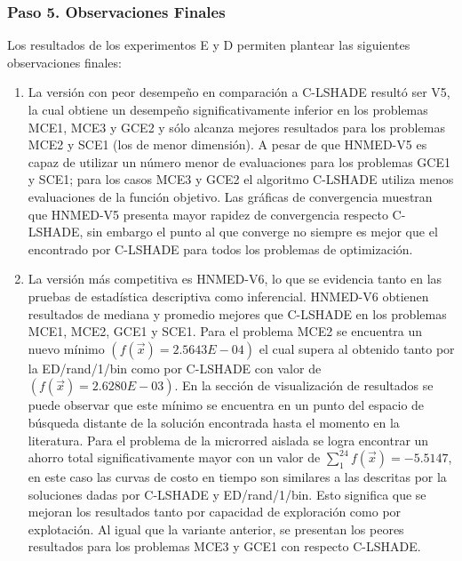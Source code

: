 \subsubsection{Paso 5. Observaciones Finales}
Los resultados de los experimentos E y D permiten plantear las siguientes observaciones finales:
\begin{enumerate}
 \item La versión con peor desempeño en comparación a C-LSHADE resultó ser V5, la cual obtiene un desempeño significativamente inferior en los problemas MCE1, MCE3 y GCE2  y sólo alcanza mejores resultados para los problemas MCE2 y SCE1 (los de menor dimensión). A pesar de que HNMED-V5 es capaz de utilizar un número menor de evaluaciones para los problemas GCE1 y SCE1; para los casos MCE3 y GCE2 el algoritmo C-LSHADE utiliza menos evaluaciones de la función objetivo. Las gráficas de convergencia muestran que HNMED-V5 presenta mayor rapidez de convergencia respecto C-LSHADE, sin embargo el punto al que converge no siempre es mejor que el encontrado por C-LSHADE para todos los problemas de optimización.  

 \item  La versión más competitiva es HNMED-V6, lo que se evidencia tanto en las pruebas de estadística descriptiva como inferencial. HNMED-V6 obtienen resultados de mediana y promedio mejores que C-LSHADE en los problemas MCE1, MCE2, GCE1 y SCE1. Para el problema MCE2 se encuentra un nuevo mínimo $(f(\vec{x})=2.5643E-04)$ el cual supera al obtenido tanto por la ED/rand/1/bin como por C-LSHADE con valor de $(f(\vec{x})=2.6280E-03)$. En la sección de visualización de resultados se puede observar que este mínimo se encuentra en un punto del espacio de búsqueda distante de la solución encontrada hasta el momento en la literatura. Para el problema de la microrred aislada se logra encontrar un ahorro total significativamente mayor con un valor de $\sum_{1}^{24}f(\vec{x})=-5.5147$, en este caso las curvas de costo en tiempo son similares a las descritas por la soluciones dadas por C-LSHADE y ED/rand/1/bin. Esto significa que se mejoran los resultados tanto por capacidad de exploración como por explotación. Al igual que la variante anterior, se presentan los peores resultados para los problemas MCE3 y GCE1 con respecto C-LSHADE.


\end{enumerate}
